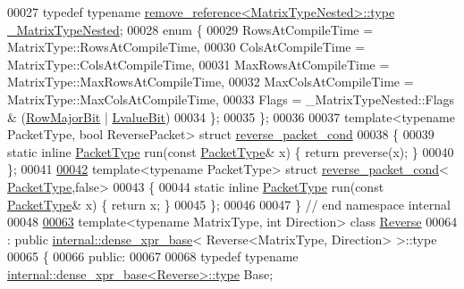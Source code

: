 \begin{DoxyCode}
00027   \textcolor{keyword}{typedef} \textcolor{keyword}{typename} \hyperlink{group___sparse_core___module}{remove\_reference<MatrixTypeNested>::type} 
      \hyperlink{group___sparse_core___module}{\_MatrixTypeNested};
00028   \textcolor{keyword}{enum} \{
00029     RowsAtCompileTime = MatrixType::RowsAtCompileTime,
00030     ColsAtCompileTime = MatrixType::ColsAtCompileTime,
00031     MaxRowsAtCompileTime = MatrixType::MaxRowsAtCompileTime,
00032     MaxColsAtCompileTime = MatrixType::MaxColsAtCompileTime,
00033     Flags = \_MatrixTypeNested::Flags & (\hyperlink{group__flags_gae4f56c2a60bbe4bd2e44c5b19cbe8762}{RowMajorBit} | \hyperlink{group__flags_gae2c323957f20dfdc6cb8f44428eaec1a}{LvalueBit})
00034   \};
00035 \};
00036 
00037 \textcolor{keyword}{template}<\textcolor{keyword}{typename} PacketType, \textcolor{keywordtype}{bool} ReversePacket> \textcolor{keyword}{struct }\hyperlink{struct_eigen_1_1internal_1_1reverse__packet__cond}{reverse\_packet\_cond}
00038 \{
00039   \textcolor{keyword}{static} \textcolor{keyword}{inline} \hyperlink{struct_eigen_1_1_packet_type}{PacketType} run(\textcolor{keyword}{const} \hyperlink{struct_eigen_1_1_packet_type}{PacketType}& x) \{ \textcolor{keywordflow}{return} preverse(x); \}
00040 \};
00041 
\hyperlink{struct_eigen_1_1internal_1_1reverse__packet__cond_3_01_packet_type_00_01false_01_4}{00042} \textcolor{keyword}{template}<\textcolor{keyword}{typename} PacketType> \textcolor{keyword}{struct }\hyperlink{struct_eigen_1_1internal_1_1reverse__packet__cond}{reverse\_packet\_cond}<
      \hyperlink{struct_eigen_1_1_packet_type}{PacketType},false>
00043 \{
00044   \textcolor{keyword}{static} \textcolor{keyword}{inline} \hyperlink{struct_eigen_1_1_packet_type}{PacketType} run(\textcolor{keyword}{const} \hyperlink{struct_eigen_1_1_packet_type}{PacketType}& x) \{ \textcolor{keywordflow}{return} x; \}
00045 \};
00046 
00047 \} \textcolor{comment}{// end namespace internal }
00048 
\hyperlink{group___core___module}{00063} \textcolor{keyword}{template}<\textcolor{keyword}{typename} MatrixType, \textcolor{keywordtype}{int} Direction> \textcolor{keyword}{class }\hyperlink{group___core___module_class_eigen_1_1_reverse}{Reverse}
00064   : \textcolor{keyword}{public} \hyperlink{struct_eigen_1_1internal_1_1dense__xpr__base}{internal::dense\_xpr\_base}< Reverse<MatrixType, Direction> >::type
00065 \{
00066   \textcolor{keyword}{public}:
00067 
00068     \textcolor{keyword}{typedef} \textcolor{keyword}{typename} \hyperlink{struct_eigen_1_1internal_1_1dense__xpr__base}{internal::dense\_xpr\_base<Reverse>::type} Base;

\end{DoxyCode}
